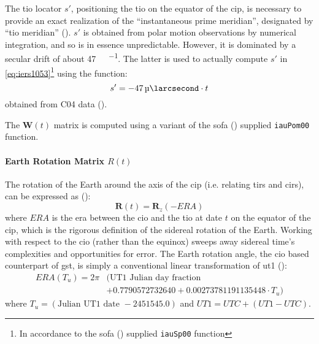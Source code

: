 The \gls{tio} locator $s'$, positioning the \gls{tio} on the equator of the \gls{cip}, 
is necessary to provide an exact realization of the ``instantaneous prime meridian'', 
designated by ``\gls{tio} meridian'' (\cite{iers2010}). $s'$ is obtained from 
polar motion observations by numerical integration, and so is in essence 
unpredictable. However, it is dominated by a secular drift of about 
\SI{47}{\micro\larcsecond\per\century}. The latter is used to actually compute 
$s'$ in \ref{eq:iers1053}\footnote{In accordance to the \gls{sofa} (\cite{SOFA20210125}) supplied \texttt{iauSp00} function} 
using the function:
\begin{equation}
  s' = \SI{-47}{\micro\larcsecond} \cdot t
  \label{eq:iers10513}
\end{equation}
obtained from C04 data (\cite{Lambert2002}).

The $\bm{W}(t)$ matrix is computed using a variant of the \gls{sofa} (\cite{SOFA20210125}) 
supplied \texttt{iauPom00} function.

\paragraph{Earth Rotation Matrix $R(t)$}\label{par:earth-rotation-matrix}
The rotation of the Earth around the axis of the \gls{cip} (i.e. relating 
\gls{tirs} and \gls{cirs}), can be expressed as (\cite{iers2010}):
\begin{equation}
  \bm{R}(t) = \bm{R}_z (-ERA)
  \label{eq:iers1055}
\end{equation}
where $ERA$ is the \gls{era} between the \gls{cio} and the \gls{tio} 
at date $t$ on the equator of the \gls{cip}, which is the rigorous definition 
of the sidereal rotation of the Earth. Working with respect to the \gls{cio} 
(rather than the equinox) sweeps away sidereal time's complexities and opportunities 
for error. The Earth rotation angle, the \gls{cio} based counterpart of \gls{gst},
is simply a conventional linear transformation of \gls{ut1} (\cite{sofa_18141_eacb}):
\begin{equation}
  \label{eq:iers10515}
  \begin{split}
    ERA(T_u) = 2 \pi & ( \text{UT1 Julian day fraction } \\
                     & + 0.7790572732640 + 0.00273781191135448 \cdot T_u )
    \end{split}
\end{equation}
where $T_u = \left( \text{Julian UT1 date } - 2451545.0 \right)$ and 
$UT1=UTC+(UT1-UTC)$. 

